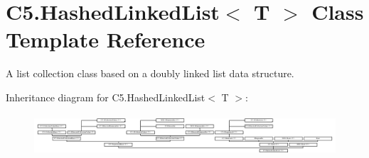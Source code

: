 \hypertarget{class_c5_1_1_hashed_linked_list}{}\section{C5.\+Hashed\+Linked\+List$<$ T $>$ Class Template Reference}
\label{class_c5_1_1_hashed_linked_list}


A list collection class based on a doubly linked list data structure.  


Inheritance diagram for C5.\+Hashed\+Linked\+List$<$ T $>$\+:\begin{figure}[H]
\begin{center}
\leavevmode
\includegraphics[height=1.577465cm]{class_c5_1_1_hashed_linked_list}
\end{center}
\end{figure}
